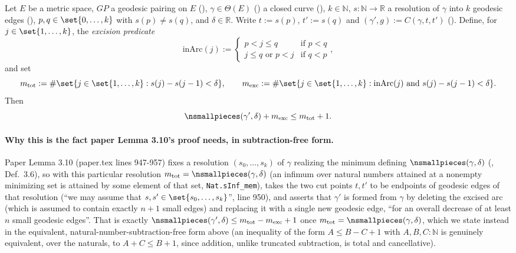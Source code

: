\begin{lemma}
  Let $E$ be a metric space, $GP$ a geodesic pairing on $E$ (), $\gamma \in
  \Theta(E)$ () a closed curve (), $k \in \mathbb{N}$, $s
  \colon \mathbb{N} \to \mathbb{R}$ a resolution of $\gamma$ into $k$ geodesic edges
  (), $p,q \in \set{0,\dots,k}$ with $s(p) \ne s(q)$, and $\delta \in
  \mathbb{R}$. Write $t := s(p)$, $t' := s(q)$ and $(\gamma',g) := C(\gamma,t,t')$
  (). Define, for $j \in \set{1,\dots,k}$, the \emph{excision predicate}
  \[
    \mathrm{inArc}(j) :=
    \begin{cases}
      p < j \le q & \text{if } p < q \\
      j \le q \text{ or } p < j & \text{if } q < p
    \end{cases}
    ,
  \]
  and set
  \[
    m_{\mathrm{tot}} := \#\set{j \in \set{1,\dots,k} : s(j)-s(j-1) < \delta}
    , \qquad
    m_{\mathrm{exc}} := \#\set{j \in \set{1,\dots,k} : \mathrm{inArc}(j) \text{ and } s(j)-s(j-1) <
    \delta}
    .
  \]
  Then
  \[
    \nsmallpieces(\gamma',\delta) + m_{\mathrm{exc}} \le m_{\mathrm{tot}} + 1
    .
  \]

  \paragraph{Why this is the fact paper Lemma 3.10's proof needs, in subtraction-free form.} Paper
  Lemma 3.10 (paper.tex lines 947-957) fixes a resolution $(s_0,\dots,s_k)$ of $\gamma$ realizing
  the minimum defining $\nsmallpieces(\gamma,\delta)$ (, Def.~3.6), so with
  this particular resolution $m_{\mathrm{tot}} = \nsmallpieces(\gamma,\delta)$ (an infimum over
  natural numbers attained at a nonempty minimizing set is attained by some element of that set,
  \texttt{Nat.sInf\_mem}), takes the two cut points $t,t'$ to be
  endpoints of geodesic edges of that resolution (``we may assume that $s,s' \in
  \set{s_0,\dots,s_k}$'', line 950), and asserts that $\gamma'$ is formed from $\gamma$ by deleting
  the excised arc (which is assumed to contain exactly $n+1$ small edges) and replacing it with a
  single new geodesic edge, ``for an overall decrease of at least $n$ small geodesic edges''. That
  is exactly $\nsmallpieces(\gamma',\delta) \le m_{\mathrm{tot}} - m_{\mathrm{exc}} + 1$ once
  $m_{\mathrm{tot}} = \nsmallpieces(\gamma,\delta)$, which we state instead in the equivalent,
  natural-number-subtraction-free form above (an inequality of the form $A \le B - C + 1$ with
  $A,B,C \colon \mathbb{N}$ is genuinely equivalent, over the naturals, to $A + C \le B + 1$, since
  addition, unlike truncated subtraction, is total and cancellative).


\end{lemma}
